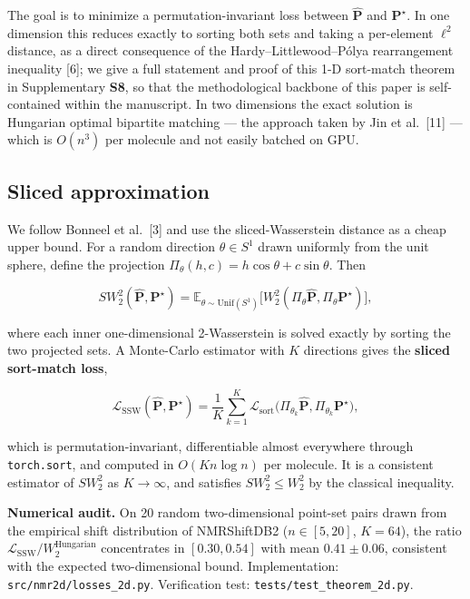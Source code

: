 \documentclass[
  11pt,
  a4paper,
]{article}
\begin{document}
The goal is to minimize a permutation-invariant loss between
\(\hat{\mathbf{P}}\) and \(\mathbf{P}^{\star}\). In one dimension this
reduces exactly to sorting both sets and taking a per-element
\(\ell^{2}\) distance, as a direct consequence of the
Hardy--Littlewood--Pólya rearrangement inequality {[}6{]}; we give a
full statement and proof of this 1-D sort-match theorem in
Supplementary \textbf{S8}, so that the methodological backbone of this
paper is self-contained within the manuscript. In two dimensions
the exact solution is Hungarian optimal bipartite matching --- the
approach taken by Jin et al.~{[}11{]} --- which is \(O(n^{3})\) per
molecule and not easily batched on GPU.

\subsection*{Sliced approximation}

We follow Bonneel et al.~{[}3{]} and use the sliced-Wasserstein distance
as a cheap upper bound. For a random direction \(\theta \in S^{1}\) drawn
uniformly from the unit sphere, define the projection
\(\Pi_{\theta}(h, c) = h\cos\theta + c\sin\theta\). Then

\[
SW_{2}^{2}(\hat{\mathbf{P}}, \mathbf{P}^{\star})
= \mathbb{E}_{\theta \sim \mathrm{Unif}(S^{1})}
    \bigl[W_{2}^{2}(\Pi_{\theta}\hat{\mathbf{P}},
                    \Pi_{\theta}\mathbf{P}^{\star})\bigr],
\]

where each inner one-dimensional 2-Wasserstein is solved exactly by
sorting the two projected sets. A Monte-Carlo estimator with \(K\)
directions gives the \textbf{sliced sort-match loss},

\[
\mathcal{L}_{\mathrm{SSW}}(\hat{\mathbf{P}}, \mathbf{P}^{\star})
= \frac{1}{K}
  \sum_{k=1}^{K}
  \mathcal{L}_{\mathrm{sort}}\bigl(
    \Pi_{\theta_k}\hat{\mathbf{P}},
    \Pi_{\theta_k}\mathbf{P}^{\star}
  \bigr),
\]

which is permutation-invariant, differentiable almost everywhere through
\texttt{torch.sort}, and computed in \(O(Kn\log n)\) per molecule. It is a
consistent estimator of \(SW_{2}^{2}\) as \(K \to \infty\), and satisfies
\(SW_{2}^{2} \leq W_{2}^{2}\) by the classical inequality.

\textbf{Numerical audit.} On 20 random two-dimensional point-set pairs drawn
from the empirical shift distribution of NMRShiftDB2
(\(n \in [5, 20]\), \(K = 64\)), the ratio
\(\mathcal{L}_{\mathrm{SSW}}/W_{2}^{\text{Hungarian}}\) concentrates in
\([0.30, 0.54]\) with mean \(0.41 \pm 0.06\), consistent with the expected
two-dimensional bound. Implementation: \texttt{src/nmr2d/losses\_2d.py}.
Verification test: \texttt{tests/test\_theorem\_2d.py}.
\end{document}
